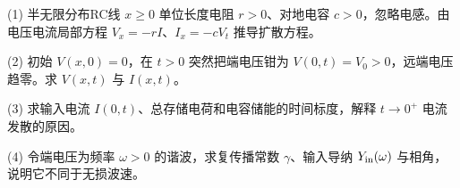(1) 半无限分布RC线 \(x\ge0\) 单位长度电阻 \(r>0\)、对地电容 \(c>0\)，忽略电感。由电压电流局部方程 \(V_x=-rI\)、\(I_x=-cV_t\) 推导扩散方程。

(2) 初始 \(V(x,0)=0\)，在 \(t>0\) 突然把端电压钳为 \(V(0,t)=V_0>0\)，远端电压趋零。求 \(V(x,t)\) 与 \(I(x,t)\)。

(3) 求输入电流 \(I(0,t)\)、总存储电荷和电容储能的时间标度，解释 \(t\to0^+\) 电流发散的原因。

(4) 令端电压为频率 \(\omega>0\) 的谐波，求复传播常数 \(\gamma\)、输入导纳 \(Y_{\rm in}(\omega)\) 与相角，说明它不同于无损波速。
